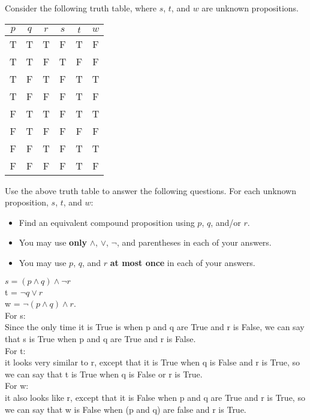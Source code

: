 \documentclass[12pt]{exam}
\begin{document}
Consider the following truth table, where $s$, $t$, and $w$ are unknown propositions.

\begin{center}
\begin{tabular}{|c c c|| c | c | c |}
\hline
$p$ & $q$ & $r$ & 
\hspace{0.8cm}$s$\hspace{0.8cm} & \hspace{0.8cm}$t$\hspace{0.8cm} & \hspace{0.8cm}$w$\hspace*{0.8cm}\\\hline
T & T & T  & F & T & F\\\hline
T & T & F  & T & F & F\\\hline
T & F & T  & F & T & T\\\hline
T & F & F  & F & T & F\\\hline
F & T & T  & F & T & T\\\hline
F & T & F  & F & F & F\\\hline
F & F & T  & F & T & T\\\hline
F & F & F  & F & T & F\\\hline
\end{tabular}
\end{center}

Use the above truth table to answer the following questions. For each unknown proposition, $s$, $t$, and $w$: 
\begin{itemize}
    \item Find an equivalent compound proposition using $p$, $q$, and/or $r$. 
    \item You may use \textbf{only} $\land$, $\lor$, $\neg$, and parentheses in each of your answers.  
    \item You may use $p$, $q$, and $r$ \textbf{at most once} in each of your answers.
\end{itemize}

\begin{solution}
$s = (p \land q) \land \neg r$\\ t = $\neg q \lor r$\\ w = $\neg (p \land q) \land r$.
\\ For s:
\\ Since the only time it is True is when p and q are True and r is False, we can say that s is True when p and q are True and r is False.
\\ For t:
\\ it looks very similar to r, except that it is True when q is False and r is True, so we can say that t is True when q is False or r is True.
\\ For w:
\\ it also looks like r, except that it is False when p and q are True and r is True, so we can say that w is False when (p and q) are false and r is True.
\end{solution}
\end{document}
